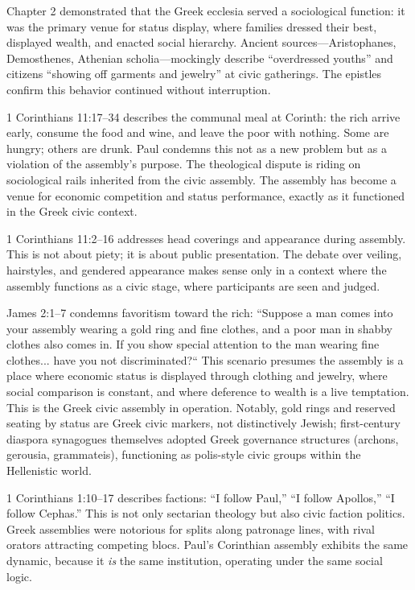 Chapter 2 demonstrated that the Greek ecclesia served a sociological function: it was the primary venue for status display, where families dressed their best, displayed wealth, and enacted social hierarchy.
Ancient sources---Aristophanes, Demosthenes, Athenian scholia---mockingly describe ``overdressed youths'' and citizens ``showing off garments and jewelry'' at civic gatherings.
The epistles confirm this behavior continued without interruption.

1 Corinthians 11:17--34 describes the communal meal at Corinth: the rich arrive early, consume the food and wine, and leave the poor with nothing.
Some are hungry; others are drunk.
Paul condemns this not as a new problem but as a violation of the assembly's purpose.
The theological dispute is riding on sociological rails inherited from the civic assembly.
The assembly has become a venue for economic competition and status performance, exactly as it functioned in the Greek civic context.

1 Corinthians 11:2--16 addresses head coverings and appearance during assembly.
This is not about piety; it is about public presentation.
The debate over veiling, hairstyles, and gendered appearance makes sense only in a context where the assembly functions as a civic stage, where participants are seen and judged.

James 2:1--7 condemns favoritism toward the rich: ``Suppose a man comes into your assembly wearing a gold ring and fine clothes, and a poor man in shabby clothes also comes in.
If you show special attention to the man wearing fine clothes... have you not discriminated?``
This scenario presumes the assembly is a place where economic status is displayed through clothing and jewelry, where social comparison is constant, and where deference to wealth is a live temptation.
This is the Greek civic assembly in operation.
Notably, gold rings and reserved seating by status are Greek civic markers, not distinctively Jewish; first-century diaspora synagogues themselves adopted Greek governance structures (archons, gerousia, grammateis), functioning as polis-style civic groups within the Hellenistic world.

1 Corinthians 1:10--17 describes factions: ``I follow Paul,'' ``I follow Apollos,'' ``I follow Cephas.''
This is not only sectarian theology but also civic faction politics.
Greek assemblies were notorious for splits along patronage lines, with rival orators attracting competing blocs.
Paul's Corinthian assembly exhibits the same dynamic, because it \emph{is} the same institution, operating under the same social logic.

